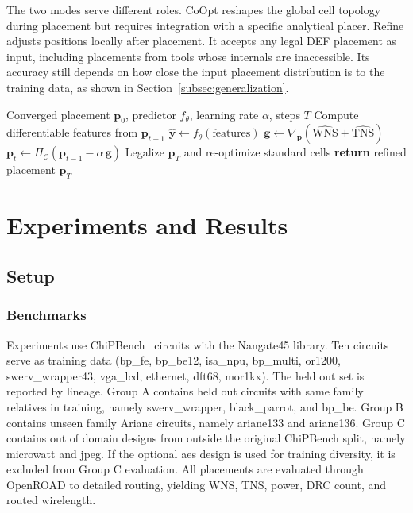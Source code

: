 \documentclass[sigconf,anonymous,review,9pt]{acmart}
\begin{document}
The two modes serve different roles. CoOpt reshapes the global cell
topology during placement but requires integration with a specific
analytical placer. Refine adjusts positions locally after placement.
It accepts any legal DEF placement as input, including placements from
tools whose internals are inaccessible. Its accuracy still depends on
how close the input placement distribution is to the training data, as
shown in Section~\ref{subsec:generalization}.

\begin{algorithm}[h]
\caption{PPAPlace-Refine Post-Placement Refinement}
\label{alg:refine}
\footnotesize
\begin{algorithmic}[1]
\REQUIRE Converged placement $\mathbf{p}_0$, predictor $f_\theta$,
  learning rate $\alpha$, steps $T$
  \STATE Compute differentiable features from $\mathbf{p}_{t-1}$
  \STATE $\hat{\mathbf{y}} \leftarrow f_\theta(\text{features})$
  \hfill{}
  \STATE $\mathbf{g} \leftarrow \nabla_{\mathbf{p}}
    (\widehat{\mathrm{WNS}} + \widehat{\mathrm{TNS}})$
  \hfill{}
  \STATE $\mathbf{p}_t \leftarrow \Pi_\mathcal{C}(\mathbf{p}_{t-1}
    - \alpha\,\mathbf{g})$
  \hfill{}
\ENDFOR
\STATE Legalize $\mathbf{p}_T$ and re-optimize standard cells
\STATE \textbf{return} refined placement $\mathbf{p}_T$
\end{algorithmic}
\end{algorithm}




\section{Experiments and Results}
\label{sec:experiments}

\subsection{Setup}
\label{subsec:setup}

\subsubsection{Benchmarks}
Experiments use ChiPBench~\cite{chipbench2025} circuits with the
Nangate45 library. Ten circuits serve as training data (bp\_fe,
bp\_be12, isa\_npu, bp\_multi, or1200, swerv\_wrapper43, vga\_lcd,
ethernet, dft68, mor1kx). The held out set is reported by lineage.
Group A contains held out circuits with same family relatives in
training, namely swerv\_wrapper, black\_parrot, and bp\_be. Group B
contains unseen family Ariane circuits, namely ariane133 and ariane136.
Group C contains out of domain designs from outside the original
ChiPBench split, namely microwatt and jpeg. If the optional aes design
is used for training diversity, it is excluded from Group C evaluation.
All placements are evaluated through OpenROAD to detailed routing,
yielding WNS, TNS, power, DRC count, and routed wirelength.
\end{document}
